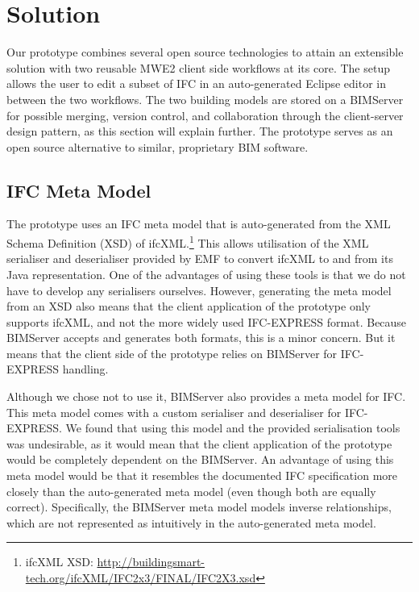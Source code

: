 \section{Solution}
\label{sec:solution}
Our prototype combines several open source technologies to attain an extensible solution with two reusable MWE2 client side workflows at its core. The setup allows the user to edit a subset of IFC in an auto-generated Eclipse editor in between the two workflows. The two building models are stored on a BIMServer for possible merging, version control, and collaboration through the client-server design pattern, as this section will explain further. The prototype serves as an open source alternative to similar, proprietary BIM software.

\subsection{IFC Meta Model}
\label{subsec:ifc_meta_model}
The prototype uses an IFC meta model that is auto-generated from the XML Schema Definition (XSD) of ifcXML.\footnote{ifcXML XSD: \url{http://buildingsmart-tech.org/ifcXML/IFC2x3/FINAL/IFC2X3.xsd}} This allows utilisation of the XML serialiser and deserialiser provided by EMF to convert ifcXML to and from its Java representation.  One of the advantages of using these tools is that we do not have to develop any serialisers ourselves. However, generating the meta model from an XSD also means that the client application of the prototype only supports ifcXML, and not  the more widely used IFC-EXPRESS format. Because BIMServer accepts and generates both formats, this is a minor concern. But it means that the client side of the prototype relies on BIMServer for IFC-EXPRESS handling.

Although we chose not to use it, BIMServer also provides a meta model for IFC. This meta model comes with a custom serialiser and deserialiser for IFC-EXPRESS. We found that using this model and the provided serialisation tools was undesirable, as it would mean that the client application of the prototype would be completely dependent on the BIMServer. An advantage of using this meta model would be that it resembles the documented IFC specification more closely than the auto-generated meta model (even though both are equally correct). Specifically, the BIMServer meta model models inverse relationships, which are not represented as intuitively in the auto-generated meta model.

